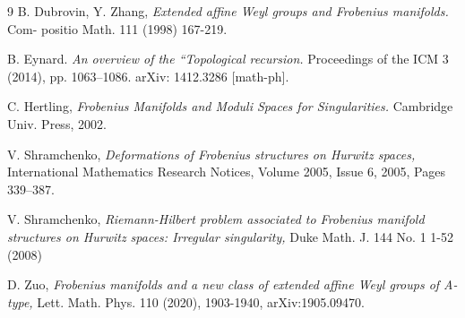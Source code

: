 \documentclass{article}
\theoremstyle{definition}
\begin{document}
\begin{thebibliography}{9}
B. Dubrovin, Y. Zhang,
\textit{Extended affine Weyl groups and Frobenius manifolds.}
 Com- positio Math. 111 (1998) 167-219.
 
 
 

B. Eynard. 
\textit{An overview of the “Topological recursion.}
 Proceedings of the ICM 3 (2014), pp. 1063–1086. arXiv: 1412.3286 [math-ph].

C. Hertling,
\textit{Frobenius Manifolds and Moduli Spaces for Singularities.}
 Cambridge Univ. Press, 2002.
 

V. Shramchenko,
\textit{Deformations of Frobenius structures on Hurwitz spaces,}
International Mathematics Research Notices, Volume 2005, Issue 6, 2005, Pages 339–387.

V. Shramchenko,
 \textit{Riemann-Hilbert problem associated to Frobenius manifold structures on Hurwitz spaces: Irregular singularity,}
  Duke Math. J. 144 No. 1 1-52 (2008)
  
D. Zuo, 
\textit{Frobenius manifolds and a new class of extended affine Weyl groups of A-type,}
 Lett. Math. Phys. 110 (2020), 1903-1940, arXiv:1905.09470.


\end{thebibliography}
\end{document}
